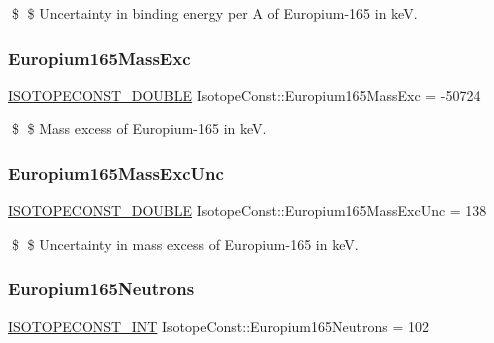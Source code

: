 \$ \$ Uncertainty in binding energy per A of Europium-\/165 in keV. \mbox{\label{group___isotope_const-_europium-_eu165_ga2dbd42ebcc47ecc71bbb0db741685c79}} 
\subsubsection{\texorpdfstring{Europium165\+Mass\+Exc}{Europium165MassExc}}
{\footnotesize\ttfamily \mbox{\hyperlink{group___isotope_const-_macros_ga8f45a7272ce02c0b4c65c44636ed719a}{I\+S\+O\+T\+O\+P\+E\+C\+O\+N\+S\+T\+\_\+\+D\+O\+U\+B\+LE}} Isotope\+Const\+::\+Europium165\+Mass\+Exc = -\/50724}

\$ \$ Mass excess of Europium-\/165 in keV. \mbox{\label{group___isotope_const-_europium-_eu165_gaa9136af598e420465dbe84a68523022c}} 
\subsubsection{\texorpdfstring{Europium165\+Mass\+Exc\+Unc}{Europium165MassExcUnc}}
{\footnotesize\ttfamily \mbox{\hyperlink{group___isotope_const-_macros_ga8f45a7272ce02c0b4c65c44636ed719a}{I\+S\+O\+T\+O\+P\+E\+C\+O\+N\+S\+T\+\_\+\+D\+O\+U\+B\+LE}} Isotope\+Const\+::\+Europium165\+Mass\+Exc\+Unc = 138}

\$ \$ Uncertainty in mass excess of Europium-\/165 in keV. \mbox{\label{group___isotope_const-_europium-_eu165_gad3c410e8501a32bac7a25a7dbd363062}} 
\subsubsection{\texorpdfstring{Europium165\+Neutrons}{Europium165Neutrons}}
{\footnotesize\ttfamily \mbox{\hyperlink{group___isotope_const-_macros_ga5f18360b3e99483a35c32d789e62621c}{I\+S\+O\+T\+O\+P\+E\+C\+O\+N\+S\+T\+\_\+\+I\+NT}} Isotope\+Const\+::\+Europium165\+Neutrons = 102}

